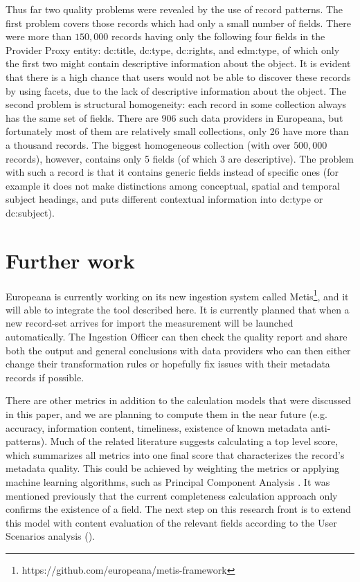 Thus far two quality problems were revealed by the use of record patterns. The first problem covers those records which had only a small number of fields. There were more than $150,000$ records having only the following four fields in the Provider Proxy entity: dc:title, dc:type, dc:rights, and edm:type, of which only the first two might contain descriptive information about the object. It is evident that there is a high chance that users would not be able to discover these records by using facets, due to the lack of descriptive information about the object. The second problem is structural homogeneity: each record in some collection always has the same set of fields. There are 906 such data providers in Europeana, but fortunately most of them are relatively small collections, only 26 have more than a thousand records. The biggest homogeneous collection (with over $500,000$ records), however, contains only 5 fields (of which 3 are descriptive). The problem with such a record is that it contains generic fields instead of specific ones (for example it does not make distinctions among conceptual, spatial and temporal subject headings, and puts different contextual information into dc:type or dc:subject).

\section{Further work}

Europeana is currently working on its new ingestion system called Metis\footnote{https://github.com/europeana/metis-framework}, and it will able to integrate the tool described here. It is currently planned that when a new record-set arrives for import the measurement will be launched automatically. The Ingestion Officer can then check the quality report and share both the output and general conclusions with data providers who can then either change their transformation rules or hopefully fix issues with their metadata records if possible.

There are other metrics in addition to the calculation models that were discussed in this paper, and we are planning to compute them in the near future (e.g. accuracy, information content, timeliness, existence of known metadata anti-patterns). Much of the related literature suggests calculating a top level score, which summarizes all metrics into one final score that characterizes the record’s metadata quality. This could be achieved by weighting the metrics or applying machine learning algorithms, such as Principal Component Analysis \cite{james2013}. It was mentioned previously that the current completeness calculation approach only confirms the existence of a field. The next step on this research front is to extend this model with content evaluation of the relevant fields according to the User Scenarios analysis (\cite{hill-charles-isaac2015}).

